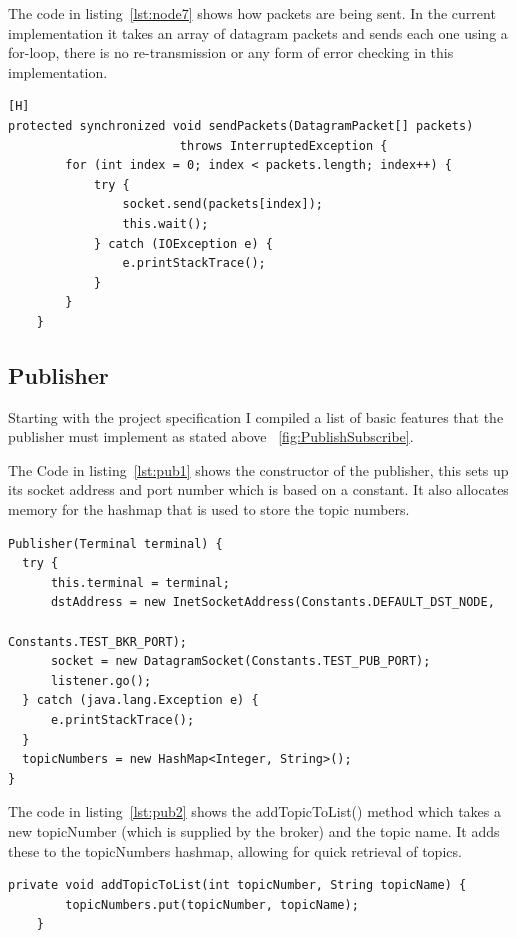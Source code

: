 \documentclass{article}
\begin{document}
The code in listing~\ref{lst:node7} shows how packets are being sent. In the current implementation it takes an array of datagram packets and sends each one using a for-loop, there is no re-transmission or any form of error checking in this implementation.

\begin{lstlisting}[caption={[Sample Code 2]sendPackets() Method}, label={lst:node7}][H]
protected synchronized void sendPackets(DatagramPacket[] packets) 
						throws InterruptedException {
		for (int index = 0; index < packets.length; index++) {
			try {
				socket.send(packets[index]);
				this.wait();
			} catch (IOException e) {
				e.printStackTrace();
			}
		}
	}
\end{lstlisting}

\subsection{Publisher}

Starting with the project specification I compiled a list of basic features that the publisher must implement as stated above ~\ref{fig:PublishSubscribe}.

The Code in listing~\ref{lst:pub1} shows the constructor of the publisher, this sets up its socket address and port number which is based on a constant. It also allocates memory for the hashmap that is used to store the topic numbers.

\begin{lstlisting}[caption={[Sample Code 2]Constructor of the Publisher}, label={lst:pub1}]
Publisher(Terminal terminal) {
  try {
	  this.terminal = terminal;
	  dstAddress = new InetSocketAddress(Constants.DEFAULT_DST_NODE, 
                                                Constants.TEST_BKR_PORT);
	  socket = new DatagramSocket(Constants.TEST_PUB_PORT);
	  listener.go();
  } catch (java.lang.Exception e) {
	  e.printStackTrace();
  }
  topicNumbers = new HashMap<Integer, String>();
}
\end{lstlisting}

The code in listing~\ref{lst:pub2} shows the addTopicToList() method which takes a new topicNumber (which is supplied by the broker) and the topic name. It adds these to the topicNumbers hashmap, allowing for quick retrieval of topics.

\begin{lstlisting}[caption={[Sample Code 2]Adding a new topic to the list}, label={lst:pub2}]
private void addTopicToList(int topicNumber, String topicName) {
		topicNumbers.put(topicNumber, topicName);
	}
\end{lstlisting}
\end{document}
